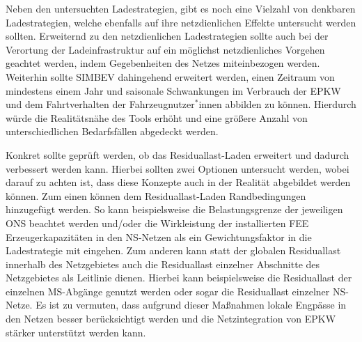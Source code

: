 Neben den untersuchten Ladestrategien, gibt es noch eine Vielzahl von denkbaren Ladestrategien, welche ebenfalls auf ihre netzdienlichen Effekte untersucht werden sollten.
Erweiternd zu den netzdienlichen Ladestrategien sollte auch bei der Verortung der Ladeinfrastruktur auf ein möglichst netzdienliches Vorgehen geachtet werden, indem Gegebenheiten des Netzes miteinbezogen werden.
Weiterhin sollte \gls{SIMBEV} dahingehend erweitert werden, einen Zeitraum von mindestens einem Jahr und saisonale Schwankungen im Verbrauch der \gls{EPKW} und dem Fahrtverhalten der Fahrzeugnutzer\(^*\)innen abbilden zu können.
Hierdurch würde die Realitätsnähe des Tools erhöht und eine größere Anzahl von unterschiedlichen Bedarfsfällen abgedeckt werden.\medskip

Konkret sollte geprüft werden, ob das Residuallast-Laden erweitert und dadurch verbessert werden kann.
Hierbei sollten zwei Optionen untersucht werden, wobei darauf zu achten ist, dass diese Konzepte auch in der Realität abgebildet werden können.
Zum einen können dem Residuallast-Laden Randbedingungen hinzugefügt werden.
So kann beispielsweise die Belastungsgrenze der jeweiligen \gls{ONS} beachtet werden und/oder die Wirkleistung der installierten \gls{FEE} Erzeugerkapazitäten in den \gls{NS}-Netzen als ein Gewichtungsfaktor in die Ladestrategie mit eingehen.
Zum anderen kann statt der globalen Residuallast innerhalb des Netzgebietes auch die Residuallast einzelner Abschnitte des Netzgebietes als Leitlinie dienen.
Hierbei kann beispielsweise die Residuallast der einzelnen \gls{MS}-Abgänge genutzt werden oder sogar die Residuallast einzelner \gls{NS}-Netze.
Es ist zu vermuten, dass aufgrund dieser Maßnahmen lokale Engpässe in den Netzen besser berücksichtigt werden und die Netzintegration von \gls{EPKW} stärker unterstützt werden kann.

